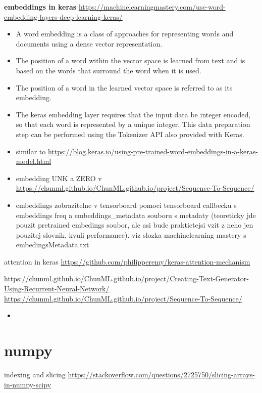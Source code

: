 \textbf{embeddings in keras}
\url{https://machinelearningmastery.com/use-word-embedding-layers-deep-learning-keras/}
\begin{itemize}
  \item A word embedding is a class of approaches for representing words and documents using a dense vector representation.
  \item The position of a word within the vector space is learned from text and is based on the words that surround the word when it is used.
  \item The position of a word in the learned vector space is referred to as its embedding.
  \item The keras embedding layer requires that the input data be integer encoded, so that each word is represented by a unique integer. This data preparation step can be performed using the Tokenizer API also provided with Keras.
  \item similar to \url{https://blog.keras.io/using-pre-trained-word-embeddings-in-a-keras-model.html}
  \item embedding UNK a ZERO v \url{https://chunml.github.io/ChunML.github.io/project/Sequence-To-Sequence/}
  \item embeddings zobrazitelne v tensorboard pomoci tensorboard callbecku s embeddings freq a embeddings\_metadata souboru s metadaty (teoreticky jde pouzit pretrained embedings soubor, ale asi bude praktictejsi vzit z neho jen pouzitej slovnik, kvuli performance). viz slozka machinelearning mastery s embedingsMetadata.txt
\end{itemize}

attention in keras
\url{https://github.com/philipperemy/keras-attention-mechanism}

\url{https://chunml.github.io/ChunML.github.io/project/Creating-Text-Generator-Using-Recurrent-Neural-Network/}
\url{https://chunml.github.io/ChunML.github.io/project/Sequence-To-Sequence/}
\begin{itemize}
  \item
\end{itemize}

\section{numpy}
indexing and slicing \url{https://stackoverflow.com/questions/2725750/slicing-arrays-in-numpy-scipy}

